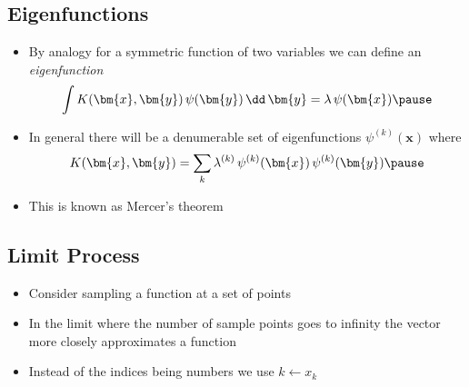 \begin{slide}
\section{Eigenfunctions}

\begin{PauseHighLight}
  \begin{itemize}
  \item By analogy for a symmetric function of two variables we can
    define an \textit{eigenfunction}
    \begin{align*}
      \int K(\bm{x}, \bm{y})\, \psi(\bm{y}) \, \dd \, \bm{y} = \lambda
      \, \psi(\bm{x})\pause
    \end{align*}
  \item In general there will be a denumerable set of eigenfunctions
    $\psi^{(k)}(\bm{x})$ where
    \begin{align*}
      K(\bm{x}, \bm{y}) = \sum_k \lambda^{(k)}\,
      \psi^{(k)}(\bm{x})\,\psi^{(k)}(\bm{y})\pause
    \end{align*}
  \item This is known as Mercer's theorem\pause
  \end{itemize}
\end{PauseHighLight}

\end{slide}


\begin{slide}
\section[-2]{Limit Process}

\pb\pause
\begin{itemize}
\item Consider sampling a function at a set of
  points\pauseh{}
  \begin{center}
    \pause
  \end{center}
\item In the limit where the number of sample points goes to infinity
  the vector more closely approximates a function\pauseh
\item Instead of the indices being numbers we use $k\leftarrow x_k$\pauseh
\end{itemize}

\end{slide}

